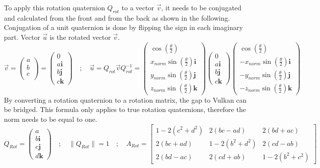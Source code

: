 To apply this rotation quaternion $Q_{rot}$ to a vector $\vec{v}$, it needs to be conjugated and calculated from the front and from the back as shown in the following. Conjugation of a unit quaternion is done by flipping the sign in each imaginary part. Vector $\vec{u}$ is the rotated vector $\vec{v}$.
\begin{equation*}
    \vec{v} =
    \begin{pmatrix}
        a \\
        b \\
        c \\
    \end{pmatrix}
    =
    \begin{pmatrix}
        0           \\
        a\textbf{i} \\
        b\textbf{j} \\
        c\textbf{k}
    \end{pmatrix}
    \quad ; \quad
    \vec{u} = Q_{rot}\vec{v}Q_{rot}^{-1}=\begin{pmatrix}
        \cos (\frac{\theta}{2} )                 \\
        x_{norm}\sin(\frac{\theta}{2})\textbf{i} \\
        y_{norm}\sin(\frac{\theta}{2})\textbf{j} \\
        z_{norm}\sin(\frac{\theta}{2})\textbf{k}
    \end{pmatrix}
    \begin{pmatrix}
        0           \\
        a\textbf{i} \\
        b\textbf{j} \\
        c\textbf{k}
    \end{pmatrix}
    \begin{pmatrix}
        \cos (\frac{\theta}{2} )                  \\
        -x_{norm}\sin(\frac{\theta}{2})\textbf{i} \\
        -y_{norm}\sin(\frac{\theta}{2})\textbf{j} \\
        -z_{norm}\sin(\frac{\theta}{2})\textbf{k}
    \end{pmatrix}
\end{equation*}
By converting a rotation quaternion to a rotation matrix, the gap to Vulkan can be bridged. This formula only applies to true rotation quaternions, therefore the norm needs to be equal to one. 
\begin{equation*}
    Q_{Rot}=    \begin{pmatrix}
        a           \\
        b\textbf{i} \\
        c\textbf{j} \\
        d\textbf{k}
    \end{pmatrix}
    \quad ; \quad
    \lVert Q_{Rot} \rVert = 1
    \quad ; \quad
    A_{Rot}
    =
    \begin{bmatrix}
        1-2(c^{2}+d^{2}) & 2(bc-ad) & 2(bd+ac) \\
        2(bc+ad) & 1-2(b^{2}+d^{2}) & 2(cd-ab) \\
        2(bd-ac) & 2(cd+ab) & 1-2(b^{2}+c^{2})
    \end{bmatrix}
\end{equation*}
